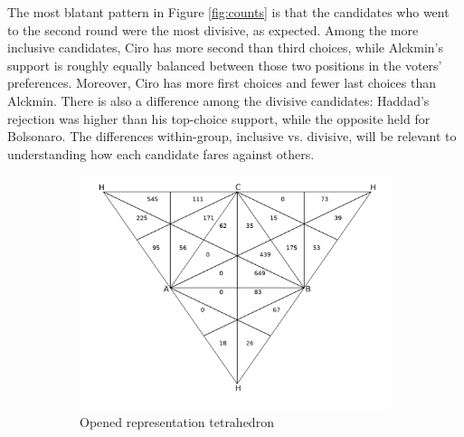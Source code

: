 \documentclass[hidelinks,11pt]{article} \usepackage[utf8]{inputenc}
\begin{document}
The most blatant pattern in Figure \ref{fig:counts} is that the candidates who went to the second round were the most divisive, as expected. Among the more inclusive candidates, Ciro has more second than third choices, while Alckmin's support is roughly equally balanced between those two positions in the voters' preferences. Moreover, Ciro has more first choices and fewer last choices than Alckmin. There is also a difference among the divisive candidates: Haddad's rejection was higher than his top-choice support, while the opposite held for Bolsonaro. The differences within-group, inclusive vs. divisive, will be relevant to understanding how each candidate fares against others.

\begin{figure}[!h] \centering
  \begin{subfigure}[b]{0.8\textwidth} \centering
\includegraphics[width=\textwidth]{./images/representation_tetrahedron.png}
 \caption{Opened representation tetrahedron}
 \label{fig:rep_ot}
\end{subfigure} \hfill
  \begin{subfigure}[b]{0.8\textwidth} \centering

\end{subfigure}
\end{figure}
\end{document}
